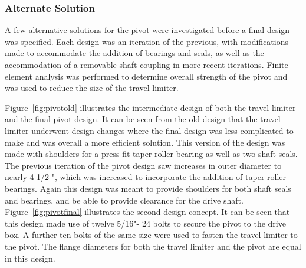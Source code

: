 \subsubsection{Alternate Solution}
A few alternative solutions for the pivot were investigated before a final design was specified. Each design was an iteration of the previous, with modifications made to accommodate the addition of bearings and seals, as well as the accommodation of a removable shaft coupling in more recent iterations. Finite element analysis was performed to determine overall strength of the pivot and was used to reduce the size of the travel limiter.

Figure~\ref{fig:pivotold} illustrates the intermediate design of both the travel limiter and the final pivot design. It can be seen from the old design that the travel limiter underwent design changes where the final design was less complicated to make and was overall a more efficient solution. This version of the design was made with shoulders for a press fit taper roller bearing as well as two shaft seals. The previous iteration of the pivot design saw increases in outer diameter to nearly 4 1/2 ", which was increased to incorporate the addition of taper roller bearings. Again this design was meant to provide shoulders for both shaft seals and bearings, and be able to provide clearance for the drive shaft. Figure~\ref{fig:pivotfinal} illustrates the second design concept. It can be seen that this design made use of twelve 5/16"- 24 bolts to secure the pivot to the drive box. A further ten bolts of the same size were used to fasten the travel limiter to the pivot. The flange diameters for both the travel limiter and the pivot are equal in this design.

